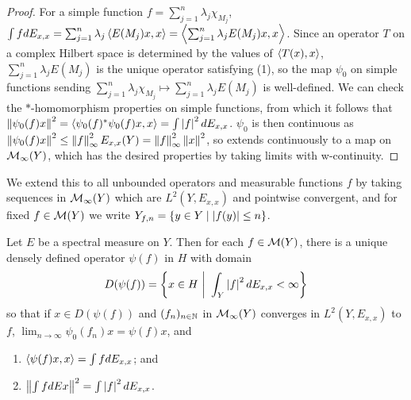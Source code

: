 \documentclass[10pt]{amsart}
\begin{document}
\begin{proof}
    For a simple function $f = \sum_{j = 1}^n \lambda_j \chi_{M_j}$, $\int f dE_{x, x} = \sum_{j = 1}^n\lambda_j\left\langle E(M_j)x, x \right\rangle = \left\langle \sum_{j = 1}^n \lambda_j E(M_j)x, x \right\rangle$. Since an operator $T$ on a complex Hilbert space is determined by the values of $\left\langle T(x), x \right\rangle$, $\sum_{j = 1}^n \lambda_j E(M_j)$ is the unique operator satisfying (1), so the map $\psi_0$ on simple functions sending $\sum_{j = 1}^n \lambda_j \chi_{M_j} \mapsto \sum_{j = 1}^n \lambda_j E(M_j)$ is well-defined. We can check the $*$-homomorphism properties on simple functions, from which it follows that $\left\| \psi_0(f)x \right\|^2 = \left\langle \psi_0(f)^*\psi_0(f)x, x \right\rangle = \int \left| f \right|^2 dE_{x, x}$. $\psi_0$ is then continuous as $\left\| \psi_0(f)x \right\|^2 \leq \left\| f \right\|^2_\infty E_{x, x}(Y) = \left\| f \right\|_\infty^2\left\| x \right\|^2$, so extends continuously to a map on $\mathcal{M}_\infty(Y)$, which has the desired properties by taking limits with w-continuity.
\end{proof}
We extend this to all unbounded operators and measurable functions $f$ by taking sequences in $\mathcal{M}_\infty(Y)$ which are $L^2(Y, E_{x, x})$ and pointwise convergent, and for fixed $f \in \mathcal{M}(Y)$ we write $Y_{f, n} = \left\{  y \in Y \mid \left| f(y) \right| \leq n  \right\}$.
\begin{proposition}\label{unbdint}
    Let $E$ be a spectral measure on $Y$. Then for each $f \in \mathcal{M}(Y)$, there is a unique densely defined operator $\psi(f)$ in $H$ with domain
    $$
        D(\psi(f)) = \set{x \in H \ \bigg| \ \int_Y \abs{f}^2 dE_{x, x} < \infty}
    $$
    so that if $x \in D(\psi(f))$ and $(f_n)_{n \in \mathbb{N}}$ in $\mathcal{M}_\infty(Y)$ converges in $L^2(Y, E_{x, x})$ to $f$, $\lim_{n \to \infty}\psi_0(f_n)x = \psi(f)x$, and
    \begin{enumerate}
        \item $\left\langle \psi(f)x, x \right\rangle = \int f dE_{x, x}$; and
        \item $\left\| \int f dE x \right\|^2 = \int \left| f \right|^2 dE_{x, x}$.
    \end{enumerate}
\end{proposition}
\end{document}
